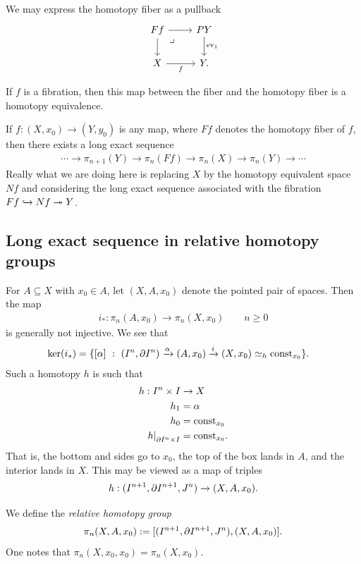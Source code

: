 \documentclass{article}[11pt]
\begin{document}
\begin{note} We may express the homotopy fiber as a pullback
\[
	\begin{tikzcd}
	Ff\pb\rar\dar & PY\dar["\ev_1" right] \\
	X\rar["f" below] & Y.
	\end{tikzcd}
\]
\end{note}

\begin{exercise} If $f$ is a fibration, then this map between the fiber and the homotopy fiber is a homotopy equivalence.
\end{exercise}

\begin{corollary} If $f: (X,x_0) \to (Y,y_0)$ is any map, where $Ff$ denotes the homotopy fiber of $f$, then there exists a long exact sequence
\begin{align*}
	\cdots \to \pi_{n+1}(Y) \to \pi_n(Ff) \to \pi_n(X) \to \pi_n(Y) \to \cdots
\end{align*}
Really what we are doing here is replacing $X$ by the homotopy equivalent space $Nf$ and considering the long exact sequence associated with the fibration $Ff\xhookrightarrow{} Nf \twoheadrightarrow Y$.
\end{corollary}

\subsection{Long exact sequence in relative homotopy groups}
For $A\subseteq X$ with $x_0 \in A$, let $(X,A,x_0)$ denote the pointed pair of spaces. Then the map
\begin{align*}
	i_\ast : \pi_n(A,x_0) \to \pi_n(X,x_0) \quad \quad n\ge 0
\end{align*}
is generally not injective. We see that
\begin{align*}
	\ker(i_\ast) &= \{ [\alpha] \ : \ (I^n,\partial I^n) \xrightarrow{\alpha} (A,x_0) \xrightarrow{i} (X,x_0) \simeq_h \text{const}_{x_0}\}.
\end{align*}
Such a homotopy $h$ is such that
\begin{align*}
	h: I^n \times I &\to X \\
	h_1 &= \alpha \\
	h_0 &= \text{const}_{x_0} \\
	\left. h \right|_{\partial I^n \times I} &= \text{const}_{x_0}.
\end{align*}
That is, the bottom and sides go to $x_0$, the top of the box lands in $A$, and the interior lands in $X$. This may be viewed as a map of triples
\begin{align*}
	h : (I^{n+1}, \partial I^{n+1}, J^n) \to (X,A,x_0).
\end{align*}
\begin{definition} We define the \textit{relative homotopy group}
\begin{align*}
	\pi_n (X,A,x_0) := [(I^{n+1}, \partial I^{n+1}, J^n), (X,A,x_0)].
\end{align*}
One notes that $\pi_n(X,x_0,x_0) = \pi_n(X,x_0)$.
\end{definition}
\end{document}
